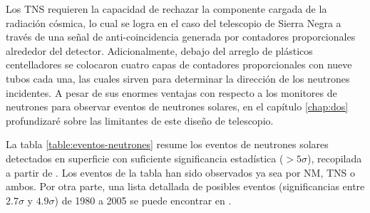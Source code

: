 Los TNS requieren la capacidad de rechazar la componente cargada de la radiación cósmica, lo cual se logra en el caso del telescopio de Sierra Negra a través de una señal de anti-coincidencia generada por contadores proporcionales alrededor del detector. Adicionalmente, debajo del arreglo de plásticos centelladores se colocaron cuatro capas de contadores proporcionales con nueve tubos cada una, las cuales sirven para determinar la dirección de los neutrones incidentes. A pesar de sus enormes ventajas con respecto a los monitores de neutrones para observar eventos de neutrones solares, en el capítulo \ref{chap:dos} profundizaré sobre las limitantes de este diseño de telescopio.

La tabla \ref{table:eventos-neutrones} resume los eventos de neutrones solares detectados en superficie con suficiente significancia estadística ($>5\sigma$), recopilada a partir de \cite{watanabe05,sako06,muraki16}. Los eventos de la tabla han sido observados ya sea por NM, TNS o ambos. Por otra parte, una lista detallada de posibles eventos (significancias entre $2.7\sigma$ y $4.9\sigma$) de \num{1980} a \num{2005} se puede encontrar en \cite{mirosh15}.

